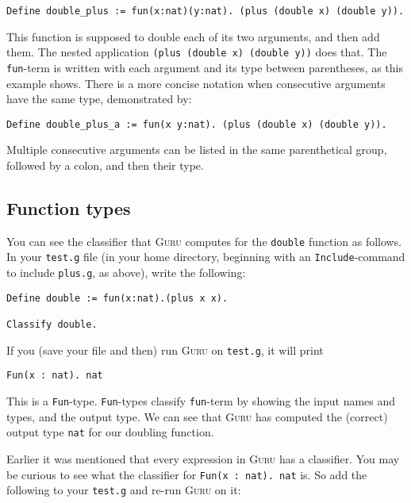 \documentclass{book}[12pt]
\newcommand{\guru}[0]{\textsc{Guru}\xspace}
\begin{document}
\begin{verbatim}
Define double_plus := fun(x:nat)(y:nat). (plus (double x) (double y)).
\end{verbatim}

\noindent This function is supposed to double each of its two
arguments, and then add them.  The nested application \texttt{(plus
(double x) (double y))} does that.  The \texttt{fun}-term is
written with each argument and its type between parentheses, as this
example shows.  There is a more concise notation when consecutive
arguments have the same type, demonstrated by:

\begin{verbatim}
Define double_plus_a := fun(x y:nat). (plus (double x) (double y)).
\end{verbatim}

\noindent Multiple consecutive arguments can be listed in the same
parenthetical group, followed by a colon, and then their type.

\subsection{Function types}
\label{ch2:func}

You can see the classifier that \guru computes for the \texttt{double}
function as follows.  In your \texttt{test.g} file (in your home
directory, beginning with an \texttt{Include}-command to include
\texttt{plus.g}, as above), write the following:

\begin{verbatim}
Define double := fun(x:nat).(plus x x).

Classify double.
\end{verbatim}

\noindent If you (save your file and then) run \guru on \texttt{test.g},
it will print

\begin{verbatim}
Fun(x : nat). nat
\end{verbatim}

\noindent This is a \texttt{Fun}-type.  \texttt{Fun}-types classify
\texttt{fun}-term by showing the input names and types, and
the output type.  We can see that \guru has computed the (correct)
output type \texttt{nat} for our doubling function.

Earlier it was mentioned that every expression in \guru has a
classifier.  You may be curious to see what the classifier for
\texttt{Fun(x : nat). nat} is.  So add the following to your
\texttt{test.g} and re-run \guru on it:
\end{document}
